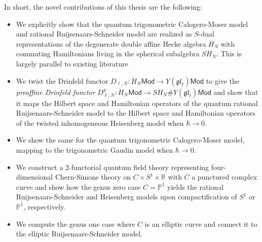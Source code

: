 \documentclass[11pt]{report}
\theoremstyle{definition}
\theoremstyle{remark}
\theoremstyle{remark}
\newcommand{\R}{\mathbb{R}}
\renewcommand{\P}{\mathbb{P}}
\begin{document}
In short, the novel contributions of this thesis are the following:
\begin{itemize}
\item We explicitly show that the quantum trigonometric Calogero-Moser model and rational Ruijsenaars-Schneider model are realized as $S$-dual representations of the degenerate double affine Hecke algebra $\ddot H_N$ with commuting Hamiltonians living in the spherical subalgebra $S\ddot H_N$. This is largely parallel to existing literature
\item We twist the Drinfeld functor $D_{\ell,N}: \dot H_N \mathsf{Mod} \to Y(\mathfrak{gl}_\ell) \mathsf{Mod}$ to give the \emph{preaffine Drinfeld functor} $D_{\ell,N}^g: \ddot H_N \mathsf{Mod} \to S\ddot H_N \# Y(\mathfrak{gl}_\ell) \mathsf{Mod}$ and show that it maps the Hilbert space and Hamiltonian operators of the quantum rational Ruijsenaars-Schneider model to the Hilbert space and Hamiltonian operators of the twisted inhomogeneous Heisenberg model when $\hbar \to 0$.
\item We show the same for the quantum trigonometric Calogero-Moser model, mapping to the trigonometric Gaudin model when $\hbar \to 0$.
\item We construct a 2-functorial quantum field theory representing four-dimensional Chern-Simons theory on $C \times S^1 \times \R$ with $C$ a punctured complex curve and show how the genus zero case $C = \P^1$ yields the rational Ruijsenaars-Schneider and Heisenberg models upon compactification of $S^1$ or $\P^1$, respectively.
\item We compute the genus one case where $C$ is an elliptic curve and connect it to the elliptic Ruijsenaars-Schneider model.
\end{itemize}
\end{document}
